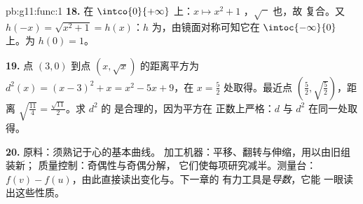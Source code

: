 \begin{solution}{pb:g11:func:1}
\textbf{18.} 在 $\intco{0}{+\infty}$ 上：$x \mapsto x^2 + 1$
，$\sqrt{\phantom{x}}$ 也，故
复合。又 $h(-x) = \sqrt{x^2 + 1} = h(x)$：$h$
为，由镜面对称可知它在
$\intoc{-\infty}{0}$ 上。为 $h(0) = 1$。

\textbf{19.} 点 $(3, 0)$ 到点
$(x, \sqrt x)$ 的距离平方为
$d^2(x) = (x - 3)^2 + x = x^2 - 5x + 9$，在
$x = \frac52$ 处取得。最近点
$\left(\frac52, \sqrt{\frac52}\right)$，距离
$\sqrt{\frac{11}{4}} = \frac{\sqrt{11}}{2}$。求 $d^2$ 的
是合理的，因为平方在
正数上严格：$d$ 与 $d^2$ 在同一处取得。

\textbf{20.} 原料：须熟记于心的基本曲线。
加工机器：平移、翻转与伸缩，用以由旧组装新；
质量控制：奇偶性与奇偶分解，
它们使每项研究减半。测量台：
$f(v) - f(u)$，由此直接读出变化与。下一章的
有力工具是\emph{导数}，它能
一眼读出这些性质。
\end{solution}
